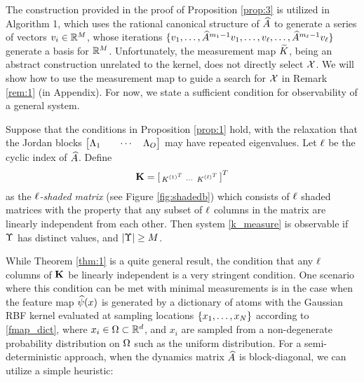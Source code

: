 The construction provided in the proof of Proposition \ref{prop:3} is utilized in Algorithm 1, which uses the rational canonical structure of $\widehat{A}$ to generate a series of vectors $v_i\in\mathbb{R}^{M}$, whose iterations $\{v_1,\dots,\widehat{A}^{m_1-1}v_1,\dots,v_{\ell},\dots,\widehat{A}^{m_{\ell}-1}v_{\ell}\}$ generate a basis for $\mathbb{R}^{M}$.
Unfortunately, the measurement map $\widetilde{K}$, being an abstract construction unrelated to the kernel, does not directly select $\mathcal{X}$. We will show how to use the measurement map to guide a search for $\mathcal{X}$ in Remark \ref{rem:1} (in Appendix). For now, we state a sufficient condition for observability of a general system. 

\begin{theorem}\label{thm:1}
 Suppose that the conditions in Proposition \ref{prop:1} hold, with the relaxation that
 the Jordan blocks $\begin{bmatrix}\Lambda_1 & &\cdots & \Lambda_{O}\end{bmatrix}$ may have 
 repeated eigenvalues. Let $\ell$ be the cyclic index of $\widehat{A}$.
 Define 
 \begin{align}\eqlabel{empKShadFull}
  \empKShadFull = \left[\begin{smallmatrix}
                    \empK^{{(1)}^T} & 
                    \cdots &
                    \empK^{{(\minmeas)}^T}
                  \end{smallmatrix}\right]^T
 \end{align}
 as the \emph{$\ell$-shaded matrix} (see Figure \ref{fig:shadedb}) which consists of $\ell$ shaded matrices with the property that any subset of
 $\ell$
 columns in the matrix are linearly independent from each
 other. Then system \eqref{k_measure} is observable if $\Upsilon$ has distinct values, and $|\Upsilon| \geq M$.
\end{theorem}

While Theorem \ref{thm:1} is a quite general result, the condition that any $\ell$ columns of $\mathbf{K}$ be linearly independent is a very stringent condition. 
One scenario where this condition can be met with minimal measurements is in the case when the feature map $\widehat{\psi}(x)$ is generated by a dictionary of atoms with the Gaussian RBF kernel evaluated at sampling locations $\{x_1, \dots, x_{N}\}$ according to \eqref{fmap_dict}, where $x_i\in\Omega\subset\mathbb{R}^d$, and $x_i$ are sampled from a non-degenerate probability distribution on $\Omega$ such as the uniform distribution. For a semi-deterministic approach, when the dynamics matrix $\widehat{A}$ is block-diagonal, we can utilize a simple heuristic:

